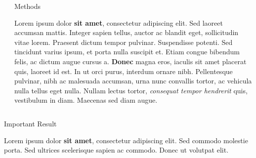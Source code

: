 \documentclass[final]{beamer}
\newlength{\onecolwid}
\newlength{\twocolwid}
\begin{document}
\begin{frame}[t]
\begin{columns}[t]
\begin{column}{\twocolwid}
\begin{columns}[t,totalwidth=\twocolwid]
\begin{column}{\onecolwid}
                \end{column} %

                \begin{column}{\onecolwid}\vspace{-.6in} %


                    \begin{block}{Methods}

                        Lorem ipsum dolor \textbf{sit amet}, consectetur adipiscing elit. Sed laoreet accumsan mattis. Integer sapien tellus, auctor ac blandit eget, sollicitudin vitae lorem. Praesent dictum tempor pulvinar. Suspendisse potenti. Sed tincidunt varius ipsum, et porta nulla suscipit et. Etiam congue bibendum felis, ac dictum augue cursus a. \textbf{Donec} magna eros, iaculis sit amet placerat quis, laoreet id est. In ut orci purus, interdum ornare nibh. Pellentesque pulvinar, nibh ac malesuada accumsan, urna nunc convallis tortor, ac vehicula nulla tellus eget nulla. Nullam lectus tortor, \textit{consequat tempor hendrerit} quis, vestibulum in diam. Maecenas sed diam augue.

                    \end{block}


                \end{column} %

            \end{columns} %


            \begin{alertblock}{Important Result}

                Lorem ipsum dolor \textbf{sit amet}, consectetur adipiscing elit. Sed commodo molestie porta. Sed ultrices scelerisque sapien ac commodo. Donec ut volutpat elit.


\end{alertblock}
\end{column}
\end{columns}
\end{frame}
\end{document}
